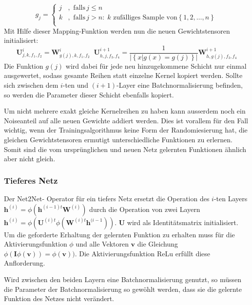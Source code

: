\begin{equation}
 g_{j} =  
 \begin{cases}
 j & , \text{ falls} \, j \leq n \\
 k & , \text{ falls} \, j>n : \;  k \text{ zufälliges Sample von} \left\{ 1,2,\ldots, n \right\} \\ 
 \end{cases} 
 \end{equation}
 Mit Hilfe dieser Mapping-Funktion werden nun die neuen Gewichtstensoren initialisiert:
 \begin{equation}
 \mathbf{U}^i_{j,k,f_1,f_2} = \mathbf{W}^i_{g(j),k,f_1,f_2} \; \; \mathbf{U}^{i+1}_{h,j,f_3,f_4}= \frac{1}{|\left\{ x | g(x)=g(j)\right\}|}\mathbf{W}^{i+1}_{h,g(j),f_3,f_4}
 \end{equation}
Die Funktion $g(j)$ wird dabei für jede neu hinzugekommene Schicht nur einmal ausgewertet, sodass gesamte Reihen statt einzelne Kernel kopiert werden. Sollte sich zwischen dem $i$-ten und $(i+1)$-Layer eine Batchnormalisierung befinden, so werden die Parameter dieser Schicht ebenfalls kopiert.

Um nicht mehrere exakt gleiche Kernelreihen zu haben kann ausserdem noch ein Noiseanteil auf alle neuen Gewichte addiert werden. Dies ist vorallem für den Fall wichtig, wenn der Trainingsalgorithmus keine Form der Randomiesierung hat, die gleichen Gewichtstensoren ermutigt unterschiedliche Funktionen zu erlernen. Somit sind die vom ursprünglichen und neuen Netz gelernten Funktionen ähnlich aber nicht gleich.

\subsubsection{Tieferes Netz}

Der Net2Net- Operator für ein tiefers Netz ersetzt die Operation des $i$-ten Layers $\mathbf{h}^{(i)} = \phi\left(\mathbf{h}^{(i-1)t} \mathbf{W}^{(i)}\right)$ durch die Operation von zwei Layern  $\mathbf{h}^{(i)} = \phi( \mathbf{U}^{(i)t} \phi(\mathbf{W}^{(i)t}  \mathbf{h}^{(i-1}) )$. $\mathbf{U}$ wird als Identitätsmatrix initialisiert. Um die geforderte Erhaltung der gelernten Funktion zu erhalten muss für die Aktivierungsfunktion $\phi$ und alle Vektoren $\mathbf{v}$ die Gleichung $\phi(\mathbf{I} \phi(\mathbf{v}))=\phi(\mathbf{v}))$. Die Aktivierungsfunktion ReLu erfüllt diese Anflorderung.

Wird zwischen den beiden Layern eine Batchnormalisierung genutzt, so müssen die Parameter der Batchnormalisierung so gewöhlt werden, dass sie die gelernte Funktion des Netzes nicht verändert.


